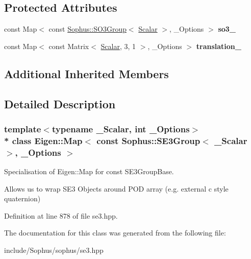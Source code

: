 \subsection*{Protected Attributes}
\begin{DoxyCompactItemize}
\item 
const Map$<$ const \hyperlink{class_sophus_1_1_s_o3_group}{Sophus\+::\+S\+O3\+Group}$<$ \hyperlink{class_eigen_1_1_map_3_01const_01_sophus_1_1_s_e3_group_3_01___scalar_01_4_00_01___options_01_4_a24b7cfd38fbe43026ced1fab3cc19584}{Scalar} $>$, \+\_\+\+Options $>$ {\bfseries so3\+\_\+}\hypertarget{class_eigen_1_1_map_3_01const_01_sophus_1_1_s_e3_group_3_01___scalar_01_4_00_01___options_01_4_afb6011ed06d79247c95c5af8cdce23ce}{}\label{class_eigen_1_1_map_3_01const_01_sophus_1_1_s_e3_group_3_01___scalar_01_4_00_01___options_01_4_afb6011ed06d79247c95c5af8cdce23ce}

\item 
const Map$<$ const Matrix$<$ \hyperlink{class_eigen_1_1_map_3_01const_01_sophus_1_1_s_e3_group_3_01___scalar_01_4_00_01___options_01_4_a24b7cfd38fbe43026ced1fab3cc19584}{Scalar}, 3, 1 $>$, \+\_\+\+Options $>$ {\bfseries translation\+\_\+}\hypertarget{class_eigen_1_1_map_3_01const_01_sophus_1_1_s_e3_group_3_01___scalar_01_4_00_01___options_01_4_a01fbfadf1de3692aeef4fa4f7a41fb56}{}\label{class_eigen_1_1_map_3_01const_01_sophus_1_1_s_e3_group_3_01___scalar_01_4_00_01___options_01_4_a01fbfadf1de3692aeef4fa4f7a41fb56}

\end{DoxyCompactItemize}
\subsection*{Additional Inherited Members}


\subsection{Detailed Description}
\subsubsection*{template$<$typename \+\_\+\+Scalar, int \+\_\+\+Options$>$\\*
class Eigen\+::\+Map$<$ const Sophus\+::\+S\+E3\+Group$<$ \+\_\+\+Scalar $>$, \+\_\+\+Options $>$}

Specialisation of Eigen\+::\+Map for const S\+E3\+Group\+Base. 

Allows us to wrap S\+E3 Objects around P\+OD array (e.\+g. external c style quaternion) 

Definition at line 878 of file se3.\+hpp.



The documentation for this class was generated from the following file\+:\begin{DoxyCompactItemize}
\item 
include/\+Sophus/sophus/se3.\+hpp\end{DoxyCompactItemize}
